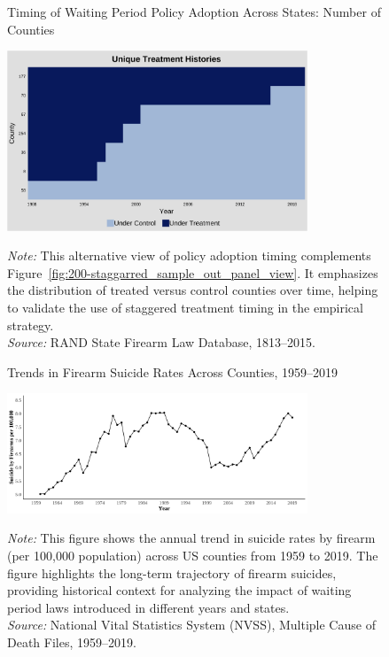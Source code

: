 \pagebreak
\clearpage

\begin{figure}[htbp]
    \centering
    \caption{Timing of Waiting Period Policy Adoption Across States: Number of Counties}    \includegraphics[width=0.8\textwidth]{figures/staggarred_sample_out_panel_view.png}
    \label{fig:staggarred_sample_out_panel_view}

    \begin{minipage}{\linewidth}
    \caption*{\footnotesize{
      \noindent\textit{Note:} This alternative view of policy adoption timing complements Figure~\ref{fig:200-staggarred_sample_out_panel_view}. It emphasizes the distribution of treated versus control counties over time, helping to validate the use of staggered treatment timing in the empirical strategy.\\
    \noindent\textit{Source:} RAND State Firearm Law Database, 1813–2015.
    }}
  \end{minipage}
\end{figure}

\pagebreak
\clearpage

\begin{figure}[htbp]
    \centering
    \caption{Trends in Firearm Suicide Rates Across Counties, 1959–2019}
    \includegraphics[width=0.8\textwidth]{figures/05-suicide_firearm_byyear_popcont.png}
    \label{fig:suicide_firearm_byyear_popcont}

    \begin{minipage}{\linewidth}
    \caption*{\footnotesize{
      \noindent\textit{Note:} This figure shows the annual trend in suicide rates by firearm (per 100,000 population) across US counties from 1959 to 2019. The figure highlights the long-term trajectory of firearm suicides, providing historical context for analyzing the impact of waiting period laws introduced in different years and states. \\
    \noindent\textit{Source:} National Vital Statistics System (NVSS), Multiple Cause of Death Files, 1959–2019.
    }}
  \end{minipage}
\end{figure}

